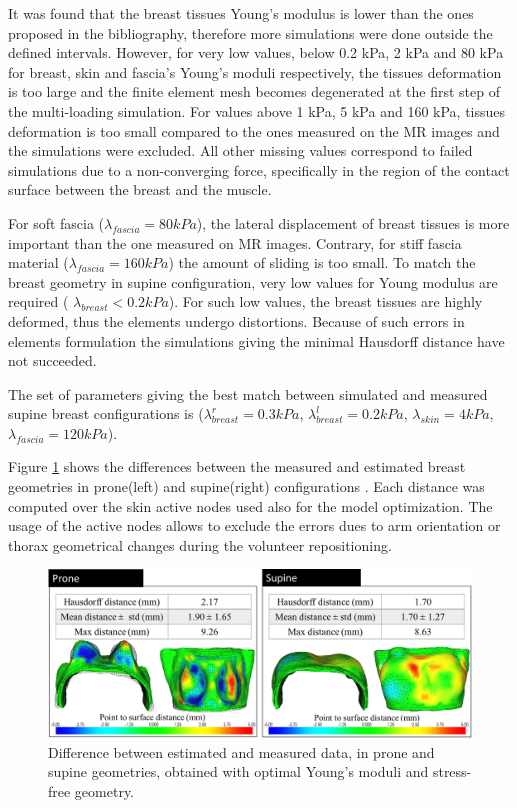 It was found that the breast tissues Young's modulus is lower than the ones proposed in the bibliography, therefore more simulations were done outside the defined intervals. However, for very low values, below 0.2 kPa, 2 kPa and 80 kPa for breast, skin and fascia's Young's moduli respectively, the tissues deformation is too large and the finite element mesh becomes degenerated at the first step of the multi-loading simulation. For values above 1 kPa, 5 kPa and 160 kPa, tissues deformation is too small compared to the ones measured on the MR images and the simulations were excluded. All other missing values correspond to failed simulations due to a non-converging force, specifically in the region of the contact surface between the breast and the muscle.


 

For soft fascia ($\lambda_{fascia} = 80kPa$), the lateral displacement of breast tissues is more important than the one measured on MR images. Contrary, for stiff fascia material ($\lambda_{fascia}=160 kPa$) the amount of sliding is too small. To match the breast geometry in supine configuration, very low values for Young modulus are required ( $\lambda_{breast}< 0.2kPa$). For such low values, the breast tissues are highly deformed, thus the elements undergo distortions. Because of such errors in elements formulation the simulations giving the minimal Hausdorff distance have not succeeded.   

The set of parameters giving the best match between simulated and measured supine breast configurations is ($\lambda_{breast}^r=0.3 kPa$, $\lambda_{breast}^l=0.2 kPa$, $\lambda_{skin}=4 kPa$, $\lambda_{fascia}=120 kPa$).  

Figure \ref{fig:optimizationresults} shows the differences between the measured and estimated breast geometries in prone(left) and supine(right) configurations . Each distance was computed over the skin active nodes used also for the model optimization. The usage of the active nodes allows to exclude the errors dues to arm orientation or thorax geometrical changes during the volunteer repositioning. 

\begin{figure}[!h]
\centering
\includegraphics[width=\textwidth,keepaspectratio]{figures/optimizationresults.png} 
\caption{Difference  between estimated and measured data, in prone and supine geometries, obtained with optimal Young's moduli and stress-free geometry. }\label{fig:optimizationresults}
\end{figure}

